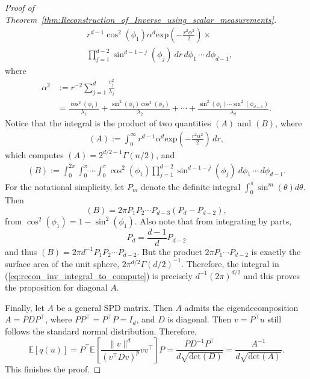 \begin{proof}[Proof of Theorem~\ref{thm:Reconstruction_of_Inverse_using_scalar_measurements}]
\begin{align*}
         & r^{d-1}\cos^2(\phi_1)\alpha^{d} \mathrm{exp}(-\frac{r^2 \alpha^2}{2}) \times    \\
         & \prod_{j=1}^{d-2} \sin^{d-1-j}(\phi_j) ~  dr \, d\phi_1 \,\cdots \,d\phi_{d-1},
    \end{align*}
    where
    \begin{align*}
        \alpha^2 & := r^{-2}\sum_{j=1}^{d} \frac{v_j^2}{\lambda_j}                                                                                                          \\
                 & = \frac{\cos^2(\phi_1)}{\lambda_1} + \frac{\sin^2(\phi_1)\cos^2(\phi_2)}{\lambda_2} + \cdots + \frac{\sin^2(\phi_1)\cdots\sin^2(\phi_{d-1})}{\lambda_d}.
    \end{align*}
    Notice that the integral is the product of two quantities $(A)$ and $(B)$, where
    \begin{align*}
        (A)  := \int_0^{\infty} r^{d-1}\alpha^{d}\mathrm{exp}(-\frac{r^2 \alpha^2}{2}) \, dr,
    \end{align*}
    which computes $(A) = 2^{d/2 -1}\Gamma(n/2)$,
    and
    \begin{align*}
        (B) := \int_0^{2\pi}\int_0^{\pi}\cdots \int_0^{\pi} \cos^2(\phi_1)
        \prod_{j=1}^{d-2} \sin^{d-1-j}(\phi_j) ~ d\phi_1 \,\cdots \,d\phi_{d-1}.
    \end{align*}
    For the notational simplicity, let $P_m$ denote the definite integral $\int_0^{\pi} \sin^{m}(\theta) d\theta$. Then
    \[
        (B) = 2\pi P_1 P_2 \cdots P_{d-3} (P_d - P_{d-2}),
    \]
    from $\cos^2(\phi_1) = 1 - \sin^2(\phi_1)$.
    Also note that from integrating by parts,
    \[P_d = \frac{d-1}{d} P_{d-2}\]
    and thus $(B) =  2\pi d^{-1} P_1 P_2 \cdots P_{d-2}.$ But the product $2\pi P_1 \cdots P_{d-2}$ is exactly the surface area of the unit sphere,
    $2 \pi^{d/2} \Gamma (d/2)^{-1}.$
    Therefore,  the integral in (\ref{eq:recon_inv_integral_to_compute}) is precisely $d^{-1}(2\pi)^{d/2}$ and this proves the proposition for diagonal $A$.

    Finally, let $A$ be a general SPD matrix. Then $A$ admits the eigendecomposition $A = P D P^{\top}$, where $PP^{\top} = P^{\top}P = I_d$, and $D$ is diagonal. Then $v = P^{\top} u$ still follows the standard normal distribution. Therefore,
    \[
        \mathbb{E}[q(u)] = P^{\top} \mathbb{E}\left[ \frac{\|v\|^{d}}{(v^{\top}Dv)^p}vv^{\top} \right]  P =
        \frac{PD^{-1}P^{\top}}{d \sqrt{\mathrm{det}(D)}} = \frac{A^{-1}}{d \sqrt{\mathrm{det}(A)}}.
    \]
    This finishes the proof.
\end{proof}